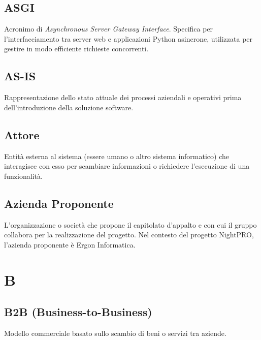 \documentclass[a4paper, 11pt, oneside]{scrartcl} %
\begin{document}
\vspace{0.5cm}

\subsection*{ASGI}
Acronimo di \textit{Asynchronous Server Gateway Interface}. Specifica per l'interfacciamento tra server web e applicazioni Python asincrone, utilizzata per gestire in modo efficiente richieste concorrenti.
\vspace{0.5cm}

\subsection*{AS-IS}
Rappresentazione dello stato attuale dei processi aziendali e operativi prima dell'introduzione della soluzione software.
\vspace{0.5cm}

\subsection*{Attore}
Entità esterna al sistema (essere umano o altro sistema informatico) che interagisce con esso per scambiare informazioni o richiedere l'esecuzione di una funzionalità.
\vspace{0.5cm}

\subsection*{Azienda Proponente}


L'organizzazione o società che propone il capitolato d'appalto e con cui il gruppo collabora per la realizzazione del progetto. Nel contesto del progetto NightPRO, l'azienda proponente è Ergon Informatica.

\vspace{0.5cm}


\section*{B}


\subsection*{B2B (Business-to-Business)}
Modello commerciale basato sullo scambio di beni o servizi tra aziende.
\vspace{0.5cm}
\end{document}
